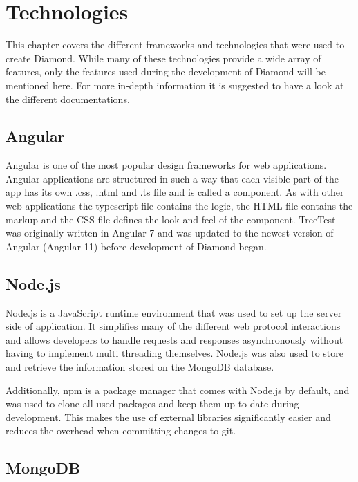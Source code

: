 \chapter{Technologies}
\label{chap:Tech}

This chapter covers the different frameworks and technologies that were used to
create Diamond. While many of these technologies provide a wide array of
features, only the features used during the development of Diamond will be
mentioned here. For more in-depth information it is suggested to have a look
at the different documentations.

\section{Angular}

Angular is one of the most popular design frameworks for web applications.
Angular applications are structured in such a way that each visible part of the
app has its own .css, .html and .ts file and is called a component. As with 
other web applications the typescript file contains the logic, the HTML file 
contains the markup and the CSS file defines the look and feel of the component.
TreeTest was originally written in Angular 7 and was updated to the newest 
version of Angular (Angular 11) before development of Diamond began.

\section{Node.js}

Node.js is a JavaScript runtime environment that was used to set up the server 
side of application. It simplifies many of the different web protocol 
interactions and allows developers to handle requests and responses 
asynchronously without having to implement multi threading themselves. Node.js 
was also used to store and retrieve the information stored on the MongoDB 
database.

Additionally, npm is a package manager that comes with Node.js by default, and 
was used to clone all used packages and keep them up-to-date during 
development. This makes the use of external libraries significantly easier and 
reduces the overhead when committing changes to git.

\section{MongoDB}

